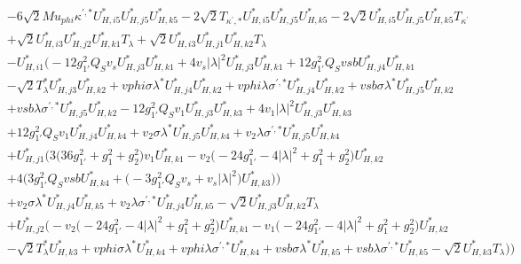 \begin{align}
 &-6 \sqrt{2} Mu_{phi} \kappa^{\prime,*} U^*_{{H},{i 5}} U^*_{{H},{j 5}} U^*_{{H},{k 5}} -2 \sqrt{2} T_{\kappa^{\prime},*} U^*_{{H},{i 5}} U^*_{{H},{j 5}} U^*_{{H},{k 5}} -2 \sqrt{2} U^*_{{H},{i 5}} U^*_{{H},{j 5}} U^*_{{H},{k 5}} T_{\kappa^\prime} \nonumber \\ 
 &+\sqrt{2} U^*_{{H},{i 3}} U^*_{{H},{j 2}} U^*_{{H},{k 1}} T_{\lambda} +\sqrt{2} U^*_{{H},{i 3}} U^*_{{H},{j 1}} U^*_{{H},{k 2}} T_{\lambda} \nonumber \\ 
 &- U^*_{{H},{i 1}} \Big(-12 g_{1'}^{2} Q_{S} v_s U^*_{{H},{j 3}} U^*_{{H},{k 1}} +4 v_s |\lambda|^2 U^*_{{H},{j 3}} U^*_{{H},{k 1}} +12 g_{1'}^{2} Q_{S} vsb U^*_{{H},{j 4}} U^*_{{H},{k 1}} \nonumber \\ 
 &- \sqrt{2} T_{\lambda}^* U^*_{{H},{j 3}} U^*_{{H},{k 2}} +vphi \sigma \lambda^* U^*_{{H},{j 4}} U^*_{{H},{k 2}} +vphi \lambda \sigma^{\prime,*} U^*_{{H},{j 4}} U^*_{{H},{k 2}} +vsb \sigma \lambda^* U^*_{{H},{j 5}} U^*_{{H},{k 2}} \nonumber \\ 
 &+vsb \lambda \sigma^{\prime,*} U^*_{{H},{j 5}} U^*_{{H},{k 2}} -12 g_{1'}^{2} Q_{S} v_1 U^*_{{H},{j 3}} U^*_{{H},{k 3}} +4 v_1 |\lambda|^2 U^*_{{H},{j 3}} U^*_{{H},{k 3}} \nonumber \\ 
 &+12 g_{1'}^{2} Q_{S} v_1 U^*_{{H},{j 4}} U^*_{{H},{k 4}} +v_2 \sigma \lambda^* U^*_{{H},{j 5}} U^*_{{H},{k 4}} +v_2 \lambda \sigma^{\prime,*} U^*_{{H},{j 5}} U^*_{{H},{k 4}} \nonumber \\ 
 &+U^*_{{H},{j 1}} \Big(3 \Big(36 g_{1'}^{2}  + g_{1}^{2} + g_{2}^{2}\Big)v_1 U^*_{{H},{k 1}} - v_2 \Big(-24 g_{1'}^{2}  -4 |\lambda|^2  + g_{1}^{2} + g_{2}^{2}\Big)U^*_{{H},{k 2}} \nonumber \\ 
 &+4 \Big(3 g_{1'}^{2} Q_{S} vsb U^*_{{H},{k 4}}  + \Big(-3 g_{1'}^{2} Q_{S} v_s  + v_s |\lambda|^2 \Big)U^*_{{H},{k 3}} \Big)\Big)\nonumber \\ 
 &+v_2 \sigma \lambda^* U^*_{{H},{j 4}} U^*_{{H},{k 5}} +v_2 \lambda \sigma^{\prime,*} U^*_{{H},{j 4}} U^*_{{H},{k 5}} - \sqrt{2} U^*_{{H},{j 3}} U^*_{{H},{k 2}} T_{\lambda} \nonumber \\ 
 &+U^*_{{H},{j 2}} \Big(- v_2 \Big(-24 g_{1'}^{2}  -4 |\lambda|^2  + g_{1}^{2} + g_{2}^{2}\Big)U^*_{{H},{k 1}} - v_1 \Big(-24 g_{1'}^{2}  -4 |\lambda|^2  + g_{1}^{2} + g_{2}^{2}\Big)U^*_{{H},{k 2}} \nonumber \\ 
 &- \sqrt{2} T_{\lambda}^* U^*_{{H},{k 3}} +vphi \sigma \lambda^* U^*_{{H},{k 4}} +vphi \lambda \sigma^{\prime,*} U^*_{{H},{k 4}} +vsb \sigma \lambda^* U^*_{{H},{k 5}} +vsb \lambda \sigma^{\prime,*} U^*_{{H},{k 5}} - \sqrt{2} U^*_{{H},{k 3}} T_{\lambda} \Big)\Big)\nonumber \\ 

\end{align}
